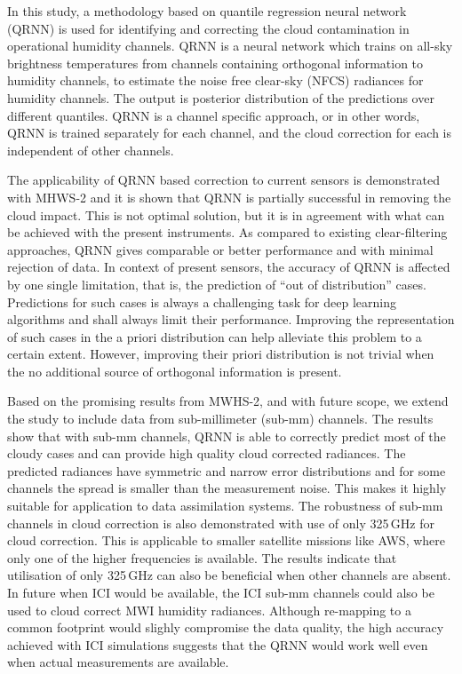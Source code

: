 \documentclass[amt]{copernicus}
\begin{document}
In this study, a methodology based on quantile regression neural network (QRNN) is used for identifying and correcting the cloud contamination in operational humidity channels. QRNN is a neural network which trains on all-sky brightness temperatures from  channels containing orthogonal information to humidity channels, to estimate the noise free clear-sky (NFCS) radiances for humidity channels. The output is posterior distribution of the predictions over different quantiles. QRNN is a channel specific approach, or in other words, QRNN is trained separately for each channel, and the cloud correction for each is independent of other channels. 
 
The applicability of QRNN based correction to current sensors is demonstrated with MHWS-2 and it is shown that QRNN  is partially successful in removing the cloud impact. This is not optimal solution, but it is in agreement with what can be achieved with the present instruments. As compared to existing clear-filtering approaches, QRNN gives comparable or better performance and with minimal rejection of data. In context of present sensors, the accuracy of QRNN is affected by one single limitation, that is, the prediction of ``out of distribution'' cases. Predictions for such cases is always a challenging task for deep learning algorithms and shall always limit their performance. Improving the representation of such cases in the a priori distribution can help alleviate this problem to a certain extent. However, improving their priori distribution is not trivial when the no additional source of orthogonal information is present. 

Based on the promising results from MWHS-2, and with future scope, we extend the study to include data from sub-millimeter (sub-mm) channels. The results show that with  sub-mm channels, QRNN is able to correctly predict most of the cloudy cases and can provide high quality cloud corrected radiances. The predicted radiances have symmetric and narrow error distributions and for some channels the spread is smaller than the measurement noise. This makes it highly suitable for application to data assimilation systems.  The robustness of sub-mm channels in cloud correction is also demonstrated with use of only 325\,GHz for cloud correction. This is applicable to smaller satellite missions like AWS, where only one of the higher frequencies is available. The results indicate that utilisation of only 325\,GHz can also be beneficial when other channels are absent. In future when ICI would be available, the ICI sub-mm channels could also be used to cloud correct MWI humidity radiances. Although re-mapping to a common footprint would slighly compromise the data quality, the high accuracy achieved with ICI simulations suggests that the QRNN would work well even when actual measurements are available.
\end{document}
